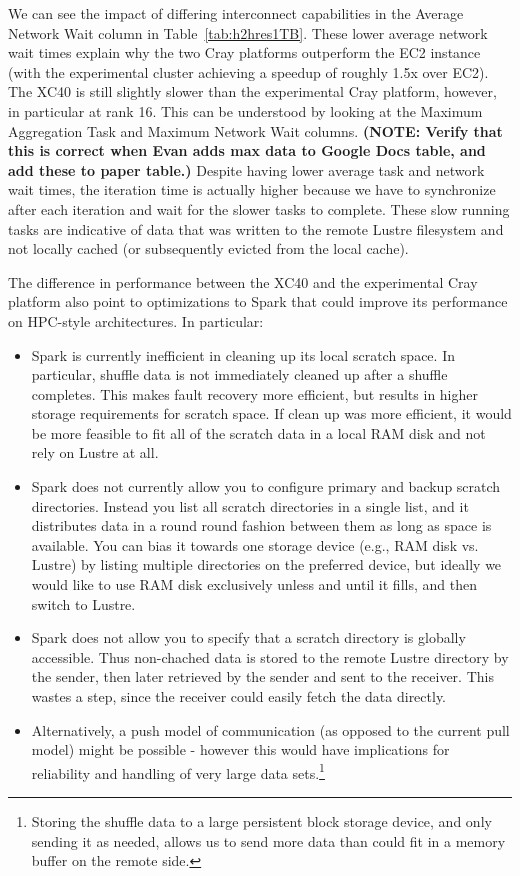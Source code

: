 We can see the impact of differing interconnect capabilities in the Average Network Wait column in Table~\ref{tab:h2hres1TB}.   These lower average network wait times explain why the two Cray platforms outperform the EC2 instance (with the experimental cluster achieving a speedup of roughly 1.5x over EC2).  The XC40 is still slightly slower than the experimental Cray platform, however, in particular at rank 16.  This can be understood by looking at the Maximum Aggregation Task and Maximum Network Wait columns.  \textbf{(NOTE: Verify that this is correct when Evan adds max data to Google Docs table, and add these to paper table.)}  Despite having lower average task and network wait times, the iteration time is actually higher because we have to synchronize after each iteration and wait for the slower tasks to complete.  These slow running tasks are indicative of data that was written to the remote Lustre filesystem and not locally cached (or subsequently evicted from the local cache).

The difference in performance between the XC40 and the experimental Cray platform also point to optimizations to Spark that could improve its performance on HPC-style architectures.  In particular:
\begin{itemize}
\item Spark is currently inefficient in cleaning up its local scratch space.  In particular, shuffle data is not immediately cleaned up after a shuffle completes.  This makes fault recovery more efficient, but results in higher storage requirements for scratch space.  If clean up was more efficient, it would be more feasible to fit all of the scratch data in a local RAM disk and not rely on Lustre at all.
\item Spark does not currently allow you to configure primary and backup scratch directories.  Instead you list all scratch directories in a single list, and it distributes data in a round round fashion between them as long as space is available.  You can bias it towards one storage device (e.g., RAM disk vs. Lustre) by listing multiple directories on the preferred device, but ideally we would like to use RAM disk exclusively unless and until it fills, and then switch to Lustre.
\item Spark does not allow you to specify that a scratch directory is globally accessible.  Thus non-chached data is stored to the remote Lustre directory by the sender, then later retrieved by the sender and sent to the receiver.  This wastes a step, since the receiver could easily fetch the data directly.
\item Alternatively, a push model of communication (as opposed to the current pull model) might be possible - however this would have implications for reliability and handling of very large data sets.\footnote{Storing the shuffle data to a large persistent block storage device, and only sending it as needed, allows us to send more data than could fit in a memory buffer on the remote side.}
\end{itemize}
